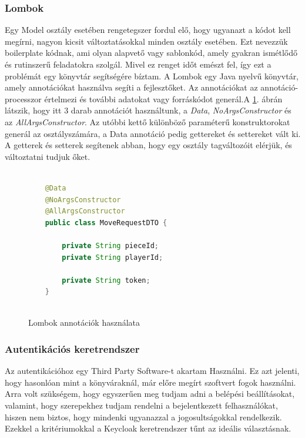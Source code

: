 \documentclass[a4paper,twoside]{article}
\begin{document}
\subsubsection{Lombok}
Egy Model osztály esetében rengetegszer fordul elő, hogy ugyanazt a kódot kell megírni, nagyon kicsit változtatásokkal minden osztály esetében. Ezt nevezzük boilerplate kódnak, ami olyan alapvető vagy sablonkód, amely gyakran ismétlődő és rutinszerű feladatokra szolgál. Mivel ez renget időt emészt fel, így ezt a problémát egy könyvtár segítségére bíztam. 
A Lombok \cite{lombok}  egy Java nyelvű könyvtár, amely
annotációkat használva segíti a fejlesztőket. Az annotációkat az annotáció-processzor értelmezi és további adatokat vagy forráskódot generál.A \ref{lombok}. ábrán látszik, hogy itt 3 darab annotációt használtunk, a \textit{Data}, \textit{NoArgsConstructor} és az \textit{AllArgsConstructor}. Az utóbbi kettő különböző paraméterű konstruktorokat generál az osztályszámára, a Data annotáció pedig gettereket és settereket vált ki. A getterek és setterek segítenek abban, hogy egy osztály tagváltozóit elérjük, és változtatni tudjuk őket.
\begin{figure}
	\caption{Lombok annotációk használata}
	\centering
	\begin{lstlisting}[language=java]
		
	@Data
	@NoArgsConstructor
	@AllArgsConstructor
	public class MoveRequestDTO {
		
		private String pieceId;
		private String playerId;
		
		private String token;
	}
		
	\end{lstlisting}
	\label{lombok}
\end{figure} 

\subsubsection{Autentikációs keretrendszer}
Az autentikációhoz egy Third Party Software-t akartam Használni. Ez azt jelenti, hogy hasonlóan mint a könyváraknál, már előre megírt szoftvert fogok használni. Arra volt szükségem, hogy egyszerűen meg tudjam adni a belépési beállításokat, valamint, hogy szerepekhez tudjam rendelni a bejelentkezett felhasználókat, hiszen nem biztos, hogy mindenki ugyanazzal a jogosultságokkal rendelkezik. Ezekkel a kritériumokkal a Keycloak\cite{keycloak} keretrendszer tűnt az ideális választásnak. 
\end{document}
